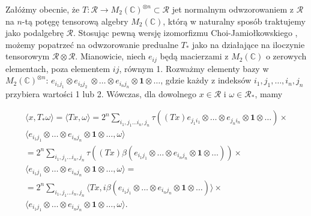 Załóżmy obecnie, że
$T: \mathcal{R} \rightarrow M_{2}(\mathbb{C})^{\otimes n}\subset \mathcal{R}$
jet normalnym odwzorowaniem z $\mathcal{R}$ na $n$-tą potęgę tensorową algebry
$M_{2}(\mathbb{C})$, którą w naturalny sposób traktujemy jako podalgebrę $\mathcal{R}$.
Stosując pewną wersję izomorfizmu Choi-Jamiołkowskiego
\cite{choi1975completely,jamiolkowski1974effective},
możemy popatrzeć na odwzorowanie predualne $T_{*}$ jako na działające na
iloczynie tensorowym $\mathcal{R}\otimes\mathcal{R}$.
Mianowicie, niech $e_{ij}$ będą macierzami z $M_{2}(\mathbb{C})$
o zerowych elementach, poza elementem $ij$, równym 1.
Rozważmy elementy bazy w
$M_{2}(\mathbb{C})^{\otimes n}$:
$e_{i_{1} j_{1}} \otimes e_{i_{2} j_{2}} \
\otimes \ldots \otimes e_{i_{n} j_{n}} \otimes \mathbf{1} \otimes \ldots$,
gdzie każdy z indeksów $i_{1}, j_{1}, \ldots, i_{n}, j_{n}$
przybiera wartości 1 lub 2.
Wówczas, dla dowolnego $x \in \mathcal{R}$ i
$\omega \in \mathcal{R}_{*}$, mamy
\begin{linenomath*}
 \begin{multline}
\langle x, T_{*} \omega \rangle =\langle T x,  \omega \rangle
=  2^{n} \sum \limits_{i_{1}, j_{1}\ldots i_{n}, j_{n}}
\tau \left((Tx) e_{j_{1} i_{1}} \otimes \ldots \otimes e_{j_{n} i_{n}}
\otimes \mathbf{1} \otimes \ldots \right) \times \\
\langle e_{i_{1} j_{1}} \otimes \ldots \otimes e_{i_{n} j_{n}}
\otimes \mathbf{1} \otimes \ldots ,\omega \rangle\\
= 2^{n} \sum \limits_{i_{1}, j_{1}\ldots i_{n}, j_{n}} \tau \left((Tx)
\beta (e_{i_{1} j_{1}} \otimes \ldots \otimes e_{i_{n} j_{n}}
\otimes \mathbf{1} \otimes \ldots ) \right) \times \\
\langle e_{i_{1} j_{1}} \otimes \ldots \otimes e_{i_{n}j_{n}}
\otimes \mathbf{1} \otimes \ldots  , \omega \rangle = \\
=  2^{n} \sum \limits_{i_{1}, j_{1}\ldots i_{n}, j_{n}}
\langle Tx ,i \beta (e_{i_{1} j_{1}} \otimes \ldots \otimes e_{i_{n} j_{n}}
\otimes \mathbf{1} \otimes \ldots) \rangle\times\\
\langle e_{i_{1} j_{1}} \otimes \ldots \otimes e_{i_{n} j_{n}}
\otimes \mathbf{1} \otimes \ldots,\omega \rangle.
 \end{multline}
\end{linenomath*}

